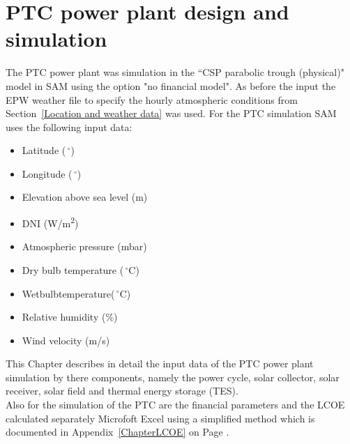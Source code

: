\documentclass[Master,MEE,english]{twbook}%
\begin{document}
\section{PTC power plant design  and simulation}
The PTC power plant was simulation in the “CSP parabolic trough (physical)" model in SAM using the option "no financial model". As before the input the EPW weather file to specify the hourly atmospheric conditions from Section~\ref{Location and weather data} was used. For the PTC simulation SAM uses the following input data:
\begin{itemize}
\item Latitude ($\,^{\circ}$)
\item Longitude ($\,^{\circ}$)
\item Elevation above sea level (m)
\item DNI (W/m\textsuperscript{2})
\item Atmospheric pressure (mbar)
\item Dry bulb temperature ($\,^{\circ}\mathrm{C}$)
\item Wetbulbtemperature($\,^{\circ}\mathrm{C}$)
\item Relative humidity (\%)
\item Wind velocity (m/s)
\end{itemize}
This Chapter describes in detail the input data of the PTC power plant simulation by there components, namely the  power cycle, solar collector, solar receiver, solar field and thermal energy storage (TES).\\
Also for the simulation of the PTC are the financial parameters and the LCOE calculated separately Microfoft Excel using a simplified method which is documented in Appendix~\ref{ChapterLCOE} on Page \pageref{ChapterLCOE}.
\end{document}
